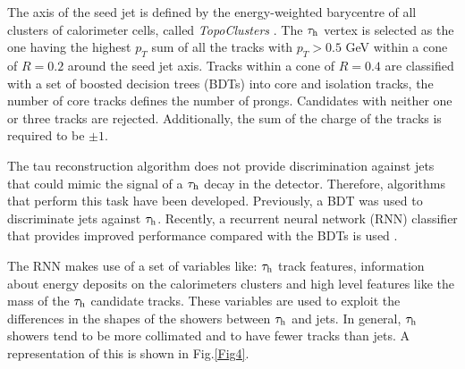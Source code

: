 The axis of the seed jet is defined by the energy-weighted barycentre of all clusters of calorimeter cells, called \textit{TopoClusters} \cite{Aad:2016upy}. The $\tau_\text{h}$ vertex is selected as the one having the highest $p_T$ sum of all the tracks with $p_T>0.5$ GeV within a cone of $R=0.2$ around the seed jet axis. Tracks within a cone of $R=0.4$ are classified with a set of boosted decision trees (BDTs) into core and isolation tracks, the number of core tracks defines the number of prongs. Candidates with neither one or three tracks are rejected. Additionally, the sum of the charge of the tracks is required to be $\pm 1$.     

The tau reconstruction algorithm does not provide discrimination against jets that could mimic the signal of a $\tau_\text{h}$ decay in the detector. Therefore, algorithms that perform this task have been developed. Previously, a BDT was used to discriminate jets against $\tau_\text{h}$. Recently, a recurrent neural network (RNN) classifier that provides improved performance compared with the BDTs is used \cite{Deutsch:2680523}.

The RNN makes use of a set of variables like: $\tau_\text{h}$ track features, information about energy deposits on the calorimeters clusters and high level features like the mass of the $\tau_\text{h}$ candidate tracks. These variables are used to exploit the differences in the shapes of the showers between $\tau_\text{h}$ and jets. In general, $\tau_\text{h}$ showers tend to be more collimated and to have fewer tracks than jets. A representation of this is shown in Fig.\ref{Fig4}. 

